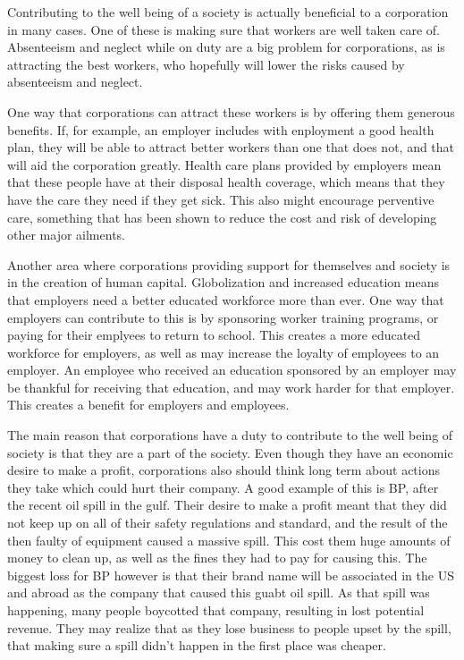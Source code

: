 Contributing to the well being of a society is actually beneficial to a corporation in many cases.
One of these is making sure that workers are well taken care of.
Absenteeism and neglect while on duty are a big problem for corporations, as is attracting the best workers, who hopefully will lower the risks caused by absenteeism and neglect.

One way that corporations can attract these workers is by offering them generous benefits.
If, for example, an employer includes with enployment a good health plan, they will be able to attract better workers than one that does not, and that will aid the corporation greatly.
Health care plans provided by employers mean that these people have at their disposal health coverage, which means that they have the care they need if they get sick.
This also might encourage perventive care, something that has been shown to reduce the cost and risk of developing other major ailments.

Another area where corporations providing support for themselves and society is in the creation of human capital.
Globolization and increased education means that employers need a better educated workforce more than ever.
One way that employers can contribute to this is by sponsoring worker training programs, or paying for their emplyees to return to school.
This creates a more educated workforce for employers, as well as may increase the loyalty of employees to an employer.
An employee who received an education sponsored by an employer may be thankful for receiving that education, and may work harder for that employer.
This creates a benefit for employers and employees.

The main reason that corporations have a duty to contribute to the well being of society is that they are a part of the society.
Even though they have an economic desire to make a profit, corporations also should think long term about actions they take which could hurt their company.
A good example of this is BP, after the recent oil spill in the gulf.
Their desire to make a profit meant that they did not keep up on all of their safety regulations and standard, and the result of the then faulty of equipment caused a massive spill.
This cost them huge amounts of money to clean up, as well as the fines they had to pay for causing this.
The biggest loss for BP however is that their brand name will be associated in the US and abroad as the company that caused this guabt oil spill.
As that spill was happening, many people boycotted that company, resulting in lost potential revenue.
They may realize that as they lose business to people upset by the spill, that making sure a spill didn't happen in the first place was cheaper.

